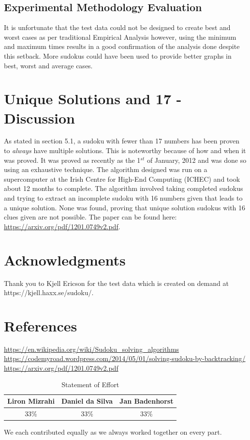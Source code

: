 \documentclass{article}
\begin{document}
\subsection{Experimental Methodology Evaluation}
It is unfortunate that the test data could not be designed to create best and worst cases as per traditional Empirical Analysis however, using the minimum and maximum times results in a good confirmation of the analysis done despite this setback. More sudokus could have been used to provide better graphs in best, worst and average cases.

\newpage
\section{Unique Solutions and 17 - Discussion}
As stated in section 5.1, a sudoku with fewer than 17 numbers has been proven to \emph{always} have multiple solutions. This is noteworthy because of how and when it was proved. It was proved as recently as the 1$^{st}$ of January, 2012 and was done so using an exhaustive technique. The algorithm designed was run on a supercomputer at the Irish Centre for High-End Computing (ICHEC) and took about 12 months to complete. The algorithm involved taking completed sudokus and trying to extract an incomplete sudoku with 16 numbers given that leads to a unique solution. None was found, proving that unique solution sudokus with 16 clues given are not possible. The paper can be found here: \url{https://arxiv.org/pdf/1201.0749v2.pdf}.

\section{Acknowledgments}
Thank you to Kjell Ericson for the test data which is created on demand at https://kjell.haxx.se/sudoku/.

\section{References}
\url{https://en.wikipedia.org/wiki/Sudoku_solving_algorithms} \\
\url{https://codemyroad.wordpress.com/2014/05/01/solving-sudoku-by-backtracking/}
\url{https://arxiv.org/pdf/1201.0749v2.pdf}\\

\begin{table}[H]
	\centering
	\begin{tabular}{|c|c|c|}
		\hline
		Liron Mizrahi & Daniel da Silva & Jan Badenhorst  \\ \hline
		33\%  & 33\%   & 33\% \\ \hline
	\end{tabular}
	\caption{Statement of Effort}
	\label{my-label}
\end{table}

We each contributed equally as we always worked together on every part.
\end{document}
